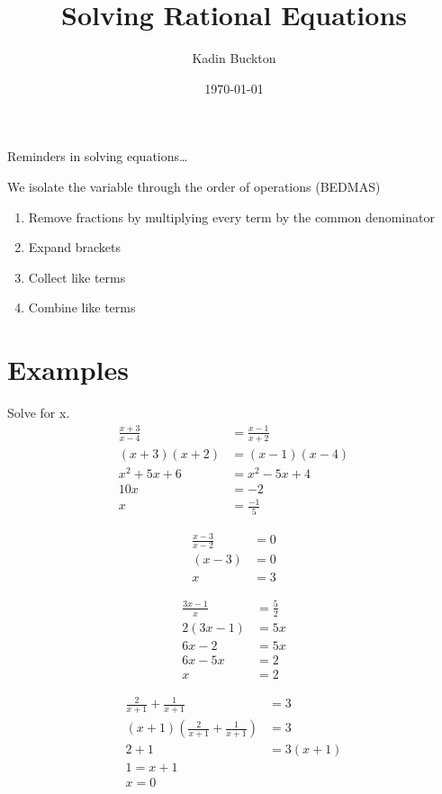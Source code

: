 \documentclass[11pt]{article}
\author{Kadin Buckton}
\date{\today}
\title{Solving Rational Equations}
\begin{document}
\maketitle
Reminders in solving equations\ldots{}

We isolate the variable through the order of operations (BEDMAS)

\begin{enumerate}
\item Remove fractions by multiplying every term by the common denominator
\item Expand brackets
\item Collect like terms
\item Combine like terms
\end{enumerate}


\section*{Examples}
\label{sec:orgcc12865}

Solve for x.
\begin{align*}
\frac{x+3}{x-4} &= \frac{x-1}{x+2}\\
(x+3)(x+2) &= (x-1)(x-4)\\
x^2+5x+6 &= x^2-5x+4\\
10x &= -2\\
x &= \frac{-1}{5}
\end{align*}

\begin{align*}
\frac{x-3}{x-2} &= 0\\
(x-3) &= 0\\
x &= 3
\end{align*}

\begin{align*}
\frac{3x-1}{x} &= \frac{5}{2}\\
2(3x-1) &= 5x\\
6x-2 &= 5x\\
6x-5x &= 2\\
x &= 2
\end{align*}

\begin{align*}
\frac{2}{x+1}+\frac{1}{x+1} &= 3\\
(x+1)(\frac{2}{x+1}+\frac{1}{x+1}) &= 3\\
2 + 1 &= 3(x+1)\\
1 = x + 1\\
x = 0
\end{align*}
\end{document}
